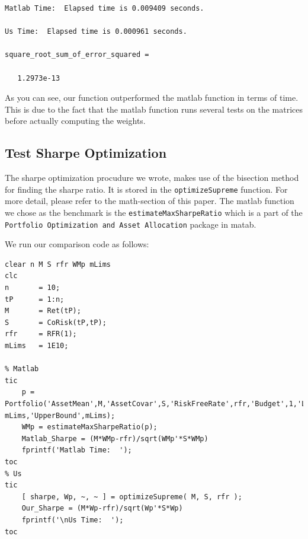 \documentclass[12pt,titlepage,a4paper]{article}
\begin{document}
        \color{lightgray} \begin{verbatim}Matlab Time:  Elapsed time is 0.009409 seconds.

Us Time:  Elapsed time is 0.000961 seconds.

square_root_sum_of_error_squared =

   1.2973e-13

\end{verbatim} \color{black}
    \begin{par}
As you can see, our function outperformed the matlab function in terms of time. This is due to the fact that the matlab function runs several tests on the matrices before actually computing the weights.
\end{par} \vspace{1em}


\subsection*{Test Sharpe Optimization}

\begin{par}
The sharpe optimization procudure we wrote, makes use of the bisection method for finding the sharpe ratio. It is stored in the \texttt{optimizeSupreme} function. For more detail, please refer to the math-section of this paper. The matlab function we chose as the benchmark is the \texttt{estimateMaxSharpeRatio} which is a part of the \texttt{Portfolio Optimization and Asset Allocation} package in matab.
\end{par} \vspace{1em}
\begin{par}
We run our comparison code as follows:
\end{par} \vspace{1em}
\begin{verbatim}
clear n M S rfr WMp mLims
clc
n       = 10;
tP      = 1:n;
M       = Ret(tP);
S       = CoRisk(tP,tP);
rfr     = RFR(1);
mLims   = 1E10;

% Matlab
tic
    p =  Portfolio('AssetMean',M,'AssetCovar',S,'RiskFreeRate',rfr,'Budget',1,'LowerBound',-mLims,'UpperBound',mLims);
    WMp = estimateMaxSharpeRatio(p);
    Matlab_Sharpe = (M*WMp-rfr)/sqrt(WMp'*S*WMp)
    fprintf('Matlab Time:  ');
toc
% Us
tic
    [ sharpe, Wp, ~, ~ ] = optimizeSupreme( M, S, rfr );
    Our_Sharpe = (M*Wp-rfr)/sqrt(Wp'*S*Wp)
    fprintf('\nUs Time:  ');
toc
\end{verbatim}
\end{document}
